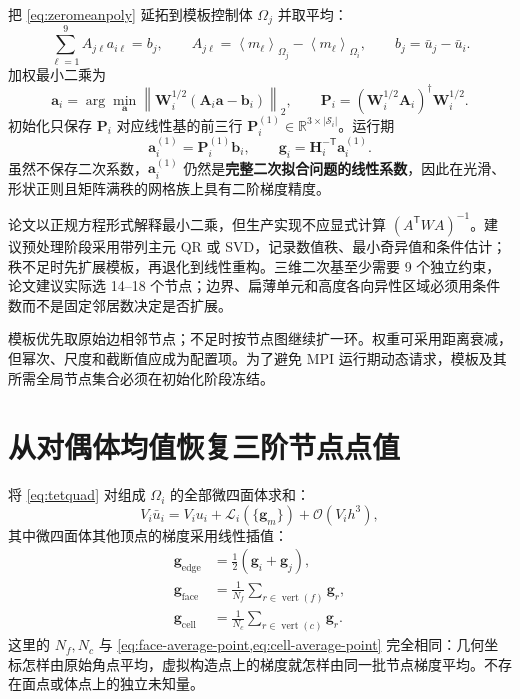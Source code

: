 \documentclass[UTF8,a4paper,11pt,openany]{ctexrep}
\numberwithin{equation}{chapter}
\newcommand{\Order}{\mathcal O}
\newcommand{\avg}[1]{\left\langle #1\right\rangle}
\newcommand{\transpose}{\mathsf T}
\begin{document}
把 \cref{eq:zeromeanpoly} 延拓到模板控制体 $\Omega_j$ 并取平均：
\begin{equation}
  \sum_{\ell=1}^{9}A_{j\ell}a_{i\ell}=b_j,
  \qquad
  A_{j\ell}=\avg{m_\ell}_{\Omega_j}-\avg{m_\ell}_{\Omega_i},
  \qquad b_j=\bar u_j-\bar u_i.
  \label{eq:lsrows}
\end{equation}
加权最小二乘为
\begin{equation}
  \bm a_i=\arg\min_{\bm a}\left\|\bm W_i^{1/2}(\bm A_i\bm a-\bm b_i)\right\|_2,
  \qquad
  \bm P_i=(\bm W_i^{1/2}\bm A_i)^{\dagger}\bm W_i^{1/2}.
\end{equation}
初始化只保存 $\bm P_i$ 对应线性基的前三行 $\bm P_i^{(1)}\in\mathbb R^{3\times|\mathcal S_i|}$。运行期
\begin{equation}
  \bm a_i^{(1)}=\bm P_i^{(1)}\bm b_i,
  \qquad
  \bm g_i=\bm H_i^{-\transpose}\bm a_i^{(1)}.
  \label{eq:gradientonly}
\end{equation}
虽然不保存二次系数，$\bm a_i^{(1)}$ 仍然是\textbf{完整二次拟合问题的线性系数}，因此在光滑、形状正则且矩阵满秩的网格族上具有二阶梯度精度。

\begin{riskbox}[数值线性代数要求]
论文以正规方程形式解释最小二乘，但生产实现不应显式计算 $(A^{\transpose}WA)^{-1}$。建议预处理阶段采用带列主元 QR 或 SVD，记录数值秩、最小奇异值和条件估计；秩不足时先扩展模板，再退化到线性重构。三维二次基至少需要 9 个独立约束，论文建议实际选 14--18 个节点；边界、扁薄单元和高度各向异性区域必须用条件数而不是固定邻居数决定是否扩展。
\end{riskbox}

模板优先取原始边相邻节点；不足时按节点图继续扩一环。权重可采用距离衰减，但幂次、尺度和截断值应成为配置项。为了避免 MPI 运行期动态请求，模板及其所需全局节点集合必须在初始化阶段冻结。

\section{从对偶体均值恢复三阶节点点值}

将 \cref{eq:tetquad} 对组成 $\Omega_i$ 的全部微四面体求和：
\begin{equation}
 V_i\bar u_i=V_iu_i+\mathcal L_i(\{\bm g_m\})+\Order(V_ih^3),
\end{equation}
其中微四面体其他顶点的梯度采用线性插值：
\begin{align}
  \bm g_{\text{edge}}&=\tfrac12(\bm g_i+\bm g_j),\\
  \bm g_{\text{face}}&=\frac1{N_f}\sum_{r\in\operatorname{vert}(f)}\bm g_r,\\
 \bm g_{\text{cell}}&=\frac1{N_c}\sum_{r\in\operatorname{vert}(c)}\bm g_r.
  \label{eq:gradinterp}
\end{align}
这里的 $N_f,N_c$ 与 \cref{eq:face-average-point,eq:cell-average-point} 完全相同：几何坐标怎样由原始角点平均，虚拟构造点上的梯度就怎样由同一批节点梯度平均。不存在面点或体点上的独立未知量。
\end{document}
